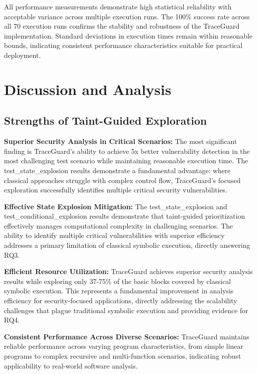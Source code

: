 All performance measurements demonstrate high statistical reliability with acceptable variance across multiple execution runs. The 100\% success rate across all 70 execution runs confirms the stability and robustness of the TraceGuard implementation. Standard deviations in execution times remain within reasonable bounds, indicating consistent performance characteristics suitable for practical deployment.

\section{Discussion and Analysis}

\subsection{Strengths of Taint-Guided Exploration}

\textbf{Superior Security Analysis in Critical Scenarios:} The most significant finding is TraceGuard's ability to achieve 5x better vulnerability detection in the most challenging test scenario while maintaining reasonable execution time. The test\_state\_explosion results demonstrate a fundamental advantage: where classical approaches struggle with complex control flow, TraceGuard's focused exploration successfully identifies multiple critical security vulnerabilities.

\textbf{Effective State Explosion Mitigation:} The test\_state\_explosion and test\_conditional\_explosion results demonstrate that taint-guided prioritization effectively manages computational complexity in challenging scenarios. The ability to identify multiple critical vulnerabilities with superior efficiency addresses a primary limitation of classical symbolic execution, directly answering RQ3.

\textbf{Efficient Resource Utilization:} TraceGuard achieves superior security analysis results while exploring only 37-75\% of the basic blocks covered by classical symbolic execution. This represents a fundamental improvement in analysis efficiency for security-focused applications, directly addressing the scalability challenges that plague traditional symbolic execution and providing evidence for RQ4.

\textbf{Consistent Performance Across Diverse Scenarios:} TraceGuard maintains reliable performance across varying program characteristics, from simple linear programs to complex recursive and multi-function scenarios, indicating robust applicability to real-world software analysis.

